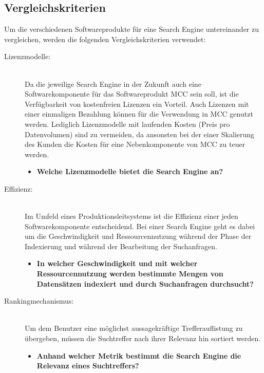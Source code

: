 \subsection{Vergleichskriterien\label{subsec4.1.1:Unterunterpunkt-1}}

Um die verschiedenen Softwareprodukte für eine Search Engine untereinander zu vergleichen, werden die folgenden Vergleichskriterien verwendet:

\begin{description}
    \item[Lizenzmodelle:]\hfill \\
    Da die jeweilige Search Engine in der Zukunft auch eine Softwarekomponente für das Softwareprodukt MCC sein soll, ist die Verfügbarkeit von kostenfreien Lizenzen ein Vorteil. Auch Lizenzen mit einer einmaligen Bezahlung können für die Verwendung in MCC genutzt werden. Lediglich Lizenzmodelle mit laufenden Kosten (Preis pro Datenvolumen) sind zu vermeiden, da ansonsten bei der einer Skalierung des Kunden die Kosten für eine Nebenkomponente von MCC zu teuer werden.
    
    \begin{itemize}
        \item \textbf{Welche Lizenzmodelle bietet die Search Engine an?}
    \end{itemize}

    \item[Effizienz:]\hfill \\
    Im Umfeld eines Produktionsleitsystems ist die Effizienz einer jeden Softwarekomponente entscheidend. Bei einer Search Engine geht es dabei um die Geschwindigkeit und Ressourcennutzung während der Phase der Indexierung und während der Bearbeitung der Suchanfragen.

    \begin{itemize}
        \item \textbf{In welcher Geschwindigkeit und mit welcher Ressourcennutzung werden bestimmte Mengen von Datensätzen indexiert und durch Suchanfragen durchsucht?}
    \end{itemize}
    
    \item[Rankingmechanismus:]\hfill \\
    Um dem Benutzer eine möglichst aussagekräftige Trefferauflistung zu übergeben, müssen die Suchtreffer nach ihrer Relevanz hin sortiert werden.

    \begin{itemize}
        \item \textbf{Anhand welcher Metrik bestimmt die Search Engine die Relevanz eines Suchtreffers?}
    \end{itemize}


\end{description}
